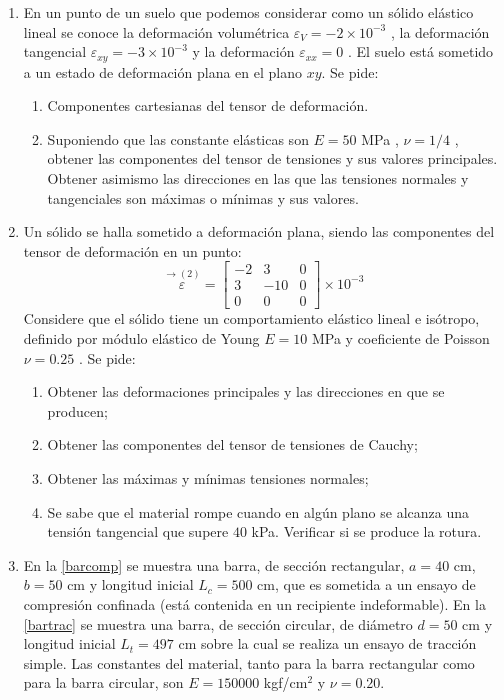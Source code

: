 \documentclass[../notas medios.tex]{subfiles}
\begin{document}
\begin{enumerate}
\item \label{punto06_m} En un punto de un suelo que podemos considerar como un sólido elástico lineal se conoce la deformación volumétrica $\varepsilon_V = -2\times10^{-3}$ , la deformación tangencial $\varepsilon_{xy} = - 3 \times 10^{-3}$ y la deformación  $\varepsilon_{xx} = 0$ . El suelo está sometido a un estado de deformación plana en el plano $x y$. Se pide:
\begin{enumerate}
\item Componentes cartesianas del tensor de deformación.
\item  Suponiendo que las constante elásticas son $E = 50$ MPa , $\nu =1/4$ , obtener las componentes del tensor de tensiones y sus valores principales. Obtener asimismo las direcciones en las que las tensiones normales y tangenciales son máximas o mínimas y sus valores.
\end{enumerate}

\item \label{punto07_m} Un sólido se halla sometido a deformación plana, siendo las componentes del tensor de deformación en un punto:
\[\overset{\rightarrow (2)}\varepsilon = \left[ \begin{array}{ccc}
-2 & 3 & 0 \\
3 & -10 & 0 \\
0 & 0 & 0
\end{array}  \right] \times 10^{-3}\]
Considere que el sólido tiene un comportamiento elástico lineal e isótropo, definido por
módulo elástico de Young $E = 10$ MPa y coeficiente de Poisson $\nu = 0.25$ .
Se pide:
\begin{enumerate}
\item Obtener las deformaciones principales y las direcciones en que se producen;
\item Obtener las componentes del tensor de tensiones de Cauchy;
\item Obtener las máximas y mínimas tensiones normales;
\item Se sabe que el material rompe cuando en algún plano se alcanza una tensión tangencial
que supere $40$ kPa. Verificar si se produce la rotura.
\end{enumerate}

\item \label{punto08_m}  En la \cref{barcomp}  se muestra una barra, de sección rectangular, $a= 40$ cm, $b = 50$ cm y longitud inicial $L_{c} = 500$ cm, que es  sometida a un ensayo de compresión confinada (está contenida en un recipiente indeformable). En la \cref{bartrac} se muestra una barra, de sección circular, de diámetro $d = 50$ cm y longitud inicial $L_{t} =497$ cm sobre la cual se realiza  un ensayo de tracción simple. Las constantes del material, tanto para la barra rectangular como para la barra circular, son $E=150000$ kgf/cm$^2$ y $\nu=0.20$.


\end{enumerate}
\end{document}
